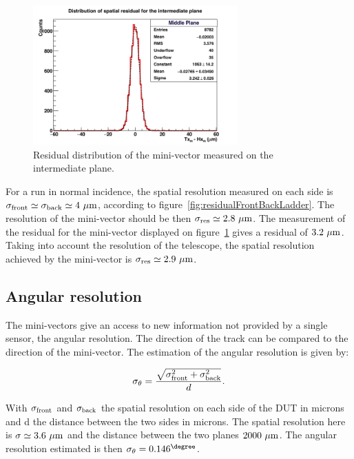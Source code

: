     \begin{figure}[!h]
      \centering
      \includegraphics[width = 0.7\textwidth]{Pictures/deformation/hDiffPosX_226056.png}
      \caption{Residual distribution of the mini-vector measured on the intermediate plane.}
      \label{fig:residualMV}
    \end{figure}

    For a run in normal incidence, the spatial resolution measured on each side is $\sigma_{\rm{front}} \simeq \sigma_{\rm{back}} \simeq 4~\rm{\mu m}$, according to figure~\ref{fig:residualFrontBackLadder}.
    The resolution of the mini-vector should be then $\sigma_{\rm{res}} \simeq 2.8~\rm{\mu m}$.
    The measurement of the residual for the mini-vector displayed on figure~\ref{fig:residualMV} gives a residual of $3.2~\rm{\mu m}$.
    Taking into account the resolution of the telescope, the spatial resolution achieved by the mini-vector is $\sigma_{\rm{res}} \simeq 2.9~\rm{\mu m}$.

   \subsection{Angular resolution}

   The mini-vectors give an access to new information not provided by a single sensor, the angular resolution.
   The direction of the track can be compared to the direction of the mini-vector.
   The estimation of the angular resolution is given by:

   \begin{equation}
     \sigma_{\theta} = \frac{\sqrt{\sigma_{\rm{front}}^2 + \sigma_{\rm{back}}^2}}{d}.
     \label{eq:angularResolution}
   \end{equation}

   With $\sigma_{\rm{front}}$ and $\sigma_{\rm{back}}$ the spatial resolution on each side of the \gls{DUT} in microns and d the distance between the two sides in microns.
   The spatial resolution here is $\sigma \simeq 3.6~\rm{\mu m}$ and the distance between the two planes $2000~\rm{\mu m}$.
   The angular resolution estimated is then $\sigma_{\theta} = 0.146^{\degree}$.  
   
